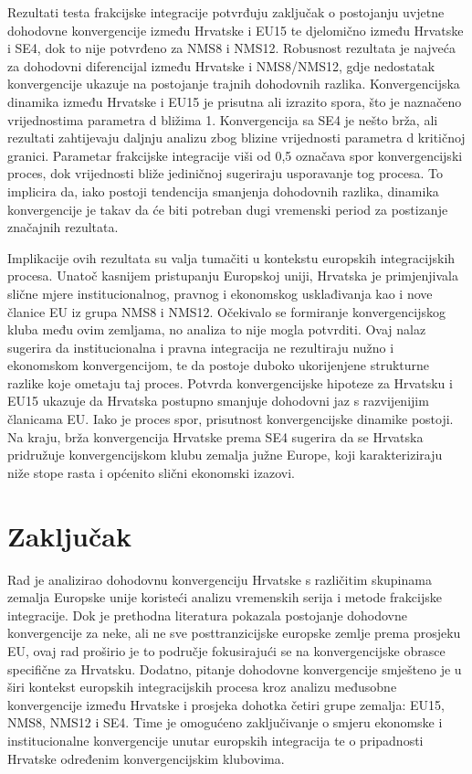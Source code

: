 \documentclass{crebsshr}
\begin{document}
    Rezultati testa frakcijske integracije potvrđuju zaključak o postojanju uvjetne dohodovne konvergencije između Hrvatske i EU15 te djelomično između Hrvatske i SE4, dok to nije potvrđeno za NMS8 i NMS12. Robusnost rezultata je najveća za dohodovni diferencijal između Hrvatske i NMS8/NMS12, gdje nedostatak konvergencije ukazuje na postojanje trajnih dohodovnih razlika. Konvergencijska dinamika između Hrvatske i EU15 je prisutna ali izrazito spora, što je naznačeno vrijednostima parametra d bližima 1. Konvergencija sa SE4 je nešto brža, ali rezultati zahtijevaju daljnju analizu zbog blizine vrijednosti parametra d kritičnoj granici. Parametar frakcijske integracije viši od 0,5 označava spor konvergencijski proces, dok vrijednosti bliže jediničnoj sugeriraju usporavanje tog procesa. To implicira da, iako postoji tendencija smanjenja dohodovnih razlika, dinamika konvergencije je takav da će biti potreban dugi vremenski period za postizanje značajnih rezultata.
    
    Implikacije ovih rezultata su valja tumačiti u kontekstu europskih integracijskih procesa. Unatoč kasnijem pristupanju Europskoj uniji, Hrvatska je primjenjivala slične mjere institucionalnog, pravnog i ekonomskog usklađivanja kao i nove članice EU iz grupa NMS8 i NMS12. Očekivalo se formiranje konvergencijskog kluba među ovim zemljama, no analiza to nije mogla potvrditi. Ovaj nalaz sugerira da institucionalna i pravna integracija ne rezultiraju nužno i ekonomskom konvergencijom, te da postoje duboko ukorijenjene strukturne razlike koje ometaju taj proces. Potvrda konvergencijske hipoteze za Hrvatsku i EU15 ukazuje da Hrvatska postupno smanjuje dohodovni jaz s razvijenijim članicama EU. Iako je proces spor, prisutnost konvergencijske dinamike postoji. Na kraju, brža konvergencija Hrvatske prema SE4 sugerira da se Hrvatska pridružuje konvergencijskom klubu zemalja južne Europe, koji karakteriziraju niže stope rasta i općenito slični ekonomski izazovi.

\section{Zaključak}
Rad je analizirao dohodovnu konvergenciju Hrvatske s različitim skupinama zemalja Europske unije koristeći analizu vremenskih serija i metode frakcijske integracije. Dok je prethodna literatura pokazala postojanje dohodovne konvergencije za neke, ali ne sve posttranzicijske europske zemlje prema prosjeku EU, ovaj rad proširio je to područje fokusirajući se na konvergencijske obrasce specifične za Hrvatsku. Dodatno, pitanje dohodovne konvergencije smješteno je u širi kontekst europskih integracijskih procesa kroz analizu međusobne konvergencije između Hrvatske i prosjeka dohotka četiri grupe zemalja: EU15, NMS8, NMS12 i SE4. Time je omogućeno zaključivanje o smjeru ekonomske i institucionalne konvergencije unutar europskih integracija te o pripadnosti Hrvatske određenim konvergencijskim klubovima.
    
\end{document}
